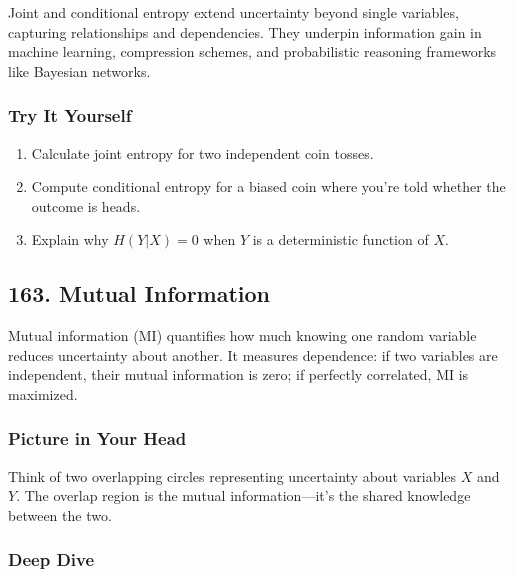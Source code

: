 \documentclass[
  letterpaper,
  DIV=11,
  numbers=noendperiod]{scrreprt}
\providecommand{\tightlist}{%
  \setlength{\itemsep}{0pt}\setlength{\parskip}{0pt}}
\begin{document}
Joint and conditional entropy extend uncertainty beyond single
variables, capturing relationships and dependencies. They underpin
information gain in machine learning, compression schemes, and
probabilistic reasoning frameworks like Bayesian networks.

\subsubsection{Try It Yourself}\label{try-it-yourself-161}

\begin{enumerate}
\def\labelenumi{\arabic{enumi}.}
\tightlist
\item
  Calculate joint entropy for two independent coin tosses.
\item
  Compute conditional entropy for a biased coin where you're told
  whether the outcome is heads.
\item
  Explain why \(H(Y|X)=0\) when \(Y\) is a deterministic function of
  \(X\).
\end{enumerate}

\subsection{163. Mutual Information}\label{mutual-information}

Mutual information (MI) quantifies how much knowing one random variable
reduces uncertainty about another. It measures dependence: if two
variables are independent, their mutual information is zero; if
perfectly correlated, MI is maximized.

\subsubsection{Picture in Your Head}\label{picture-in-your-head-162}

Think of two overlapping circles representing uncertainty about
variables \(X\) and \(Y\). The overlap region is the mutual
information---it's the shared knowledge between the two.

\subsubsection{Deep Dive}\label{deep-dive-162}
\end{document}
